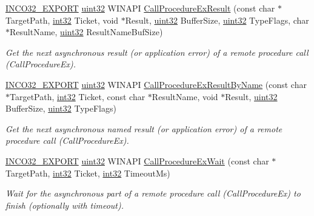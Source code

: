 \begin{DoxyCompactItemize}
\hyperlink{inco__32_8h_a09505cad5bbb66fc36750a4fbca0444b}{I\+N\+C\+O32\+\_\+\+E\+X\+P\+O\+RT} \hyperlink{indeltypes_8h_a4b435a49c74bb91f284f075e63416cb6}{uint32} W\+I\+N\+A\+PI \hyperlink{group__commonfunctions_ga293b3f14ba486519c29ac9abfd0471e3}{Call\+Procedure\+Ex\+Result} (const char $\ast$Target\+Path, \hyperlink{indeltypes_8h_ac44d0188f4f50fd9b03031c1a06bd0a9}{int32} Ticket, void $\ast$Result, \hyperlink{indeltypes_8h_a4b435a49c74bb91f284f075e63416cb6}{uint32} Buffer\+Size, \hyperlink{indeltypes_8h_a4b435a49c74bb91f284f075e63416cb6}{uint32} Type\+Flags, char $\ast$Result\+Name, \hyperlink{indeltypes_8h_a4b435a49c74bb91f284f075e63416cb6}{uint32} Result\+Name\+Buf\+Size)
\begin{DoxyCompactList}\small\item\em Get the next asynchronous result (or application error) of a remote procedure call (Call\+Procedure\+Ex). \end{DoxyCompactList}\item 
\hyperlink{inco__32_8h_a09505cad5bbb66fc36750a4fbca0444b}{I\+N\+C\+O32\+\_\+\+E\+X\+P\+O\+RT} \hyperlink{indeltypes_8h_a4b435a49c74bb91f284f075e63416cb6}{uint32} W\+I\+N\+A\+PI \hyperlink{group__commonfunctions_ga569a93aeed06c2745365c881be5e7828}{Call\+Procedure\+Ex\+Result\+By\+Name} (const char $\ast$Target\+Path, \hyperlink{indeltypes_8h_ac44d0188f4f50fd9b03031c1a06bd0a9}{int32} Ticket, const char $\ast$Result\+Name, void $\ast$Result, \hyperlink{indeltypes_8h_a4b435a49c74bb91f284f075e63416cb6}{uint32} Buffer\+Size, \hyperlink{indeltypes_8h_a4b435a49c74bb91f284f075e63416cb6}{uint32} Type\+Flags)
\begin{DoxyCompactList}\small\item\em Get the next asynchronous named result (or application error) of a remote procedure call (Call\+Procedure\+Ex). \end{DoxyCompactList}\item 
\hyperlink{inco__32_8h_a09505cad5bbb66fc36750a4fbca0444b}{I\+N\+C\+O32\+\_\+\+E\+X\+P\+O\+RT} \hyperlink{indeltypes_8h_a4b435a49c74bb91f284f075e63416cb6}{uint32} W\+I\+N\+A\+PI \hyperlink{group__commonfunctions_ga1b55ca711acd0dcc672e5fefe5cff27e}{Call\+Procedure\+Ex\+Wait} (const char $\ast$Target\+Path, \hyperlink{indeltypes_8h_ac44d0188f4f50fd9b03031c1a06bd0a9}{int32} Ticket, \hyperlink{indeltypes_8h_ac44d0188f4f50fd9b03031c1a06bd0a9}{int32} Timeout\+Ms)
\begin{DoxyCompactList}\small\item\em Wait for the asynchronous part of a remote procedure call (Call\+Procedure\+Ex) to finish (optionally with timeout). \end{DoxyCompactList}\end{DoxyCompactItemize}
